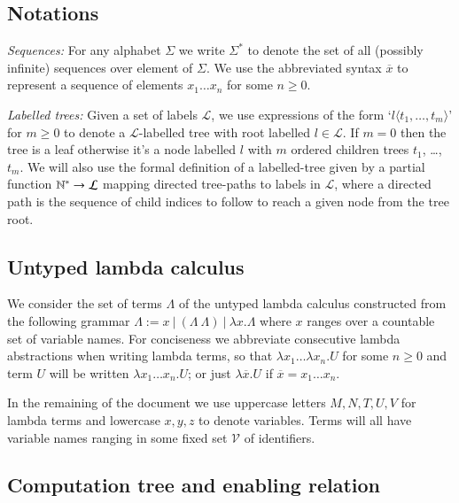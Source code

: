 \documentclass{elsarticle}
\theoremstyle{plain}
\theoremstyle{definition}
\theoremstyle{remark}
\newcommand\VarSet{\mathcal{V}}
\begin{document}
\subsection{Notations}
\emph{Sequences:} For any alphabet $\Sigma$ we write $\Sigma^*$ to denote the set of all (possibly infinite) sequences over element of $\Sigma$.
 We use the abbreviated syntax $\overline{x}$ to represent a sequence of elements $x_1 \ldots x_n$ for some $n\geq0$.

 \emph{Labelled trees:} Given a set of labels $\mathcal{L}$, we use expressions of the form `$l\langle t_1, \ldots, t_m \rangle$' for $m \geq 0$ to denote a $\mathcal{L}$-labelled tree with root labelled $l\in \mathcal{L}$. If $m=0$ then the tree is a leaf otherwise it's a node labelled $l$ with $m$ ordered children trees $t_1$, \ldots, $t_m$. We will also use the formal definition of a labelled-tree given by a partial function $\mathbb{N}^* \rightarrow \mathcal{L}$ mapping directed tree-paths to labels in $\mathcal{L}$, where a directed path is the sequence of child indices to follow to reach a given node from the tree root.

\subsection{Untyped lambda calculus}
We consider the set of terms $\Lambda$ of the untyped lambda calculus constructed from the following grammar $\Lambda := x\ |\ (\Lambda\ \Lambda)\ |\ \lambda x. \Lambda $
where $x$ ranges over a countable set of variable names.
For conciseness we abbreviate consecutive lambda abstractions when writing lambda terms, so that $\lambda x_1 \ldots \lambda x_n . U$ for some $n\geq 0$ and term $U$ will be written $\lambda x_1 \ldots x_n . U$; or just
$\lambda \overline{x} . U$ if $\overline{x} = x_1 \ldots x_n$.

In the remaining of the document we use uppercase letters $M, N, T, U, V$ for lambda terms and lowercase $x,y,z$ to denote variables. Terms will all have variable names ranging in some fixed set $\VarSet$ of identifiers.

\subsection{Computation tree and enabling relation}
\end{document}
